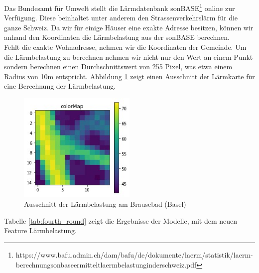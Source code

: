 Das Bundesamt für Umwelt stellt die Lärmdatenbank sonBASE\footnote{https://www.bafu.admin.ch/dam/bafu/de/dokumente/laerm/statistik/laerm-berechnungsonbaseermitteltlaermbelastunginderschweiz.pdf} online zur Verfügung. Diese beinhaltet unter anderem den Strassenverkehrslärm für die ganze Schweiz. Da wir für einige Häuser eine exakte Adresse besitzen, können wir anhand den Koordinaten die Lärmbelastung aus der sonBASE berechnen.\\
Fehlt die exakte Wohnadresse, nehmen wir die Koordinaten der Gemeinde. Um die Lärmbelastung zu berechnen nehmen wir nicht nur den Wert an einem Punkt sondern berechnen einen Durchschnittswert von 255 Pixel, was etwa einem Radius von 10m entspricht. Abbildung \ref{fig:noise} zeigt einen Ausschnitt der Lärmkarte für eine Berechnung der Lärmbelastung.\\[2ex]
\begin{figure}[ht]
\centering
\includegraphics[width=0.5\textwidth]{images/noise.jpeg}
\caption[Ausschnitt der Lärmbelastung am Brausebad (Basel)]{Ausschnitt der Lärmbelastung am Brausebad (Basel)}
\label{fig:noise}
\end{figure}
\newline
%
Tabelle \ref{tab:fourth_round} zeigt die Ergebnisse der Modelle, mit dem neuen Feature Lärmbelastung.\\[2ex]
%
\begin{table}[ht]
\centering
{}
\caption{Ergebnisse mit Einbezug der Lärmbelastung}
\label{tab:fourth_round}
\end{table}
